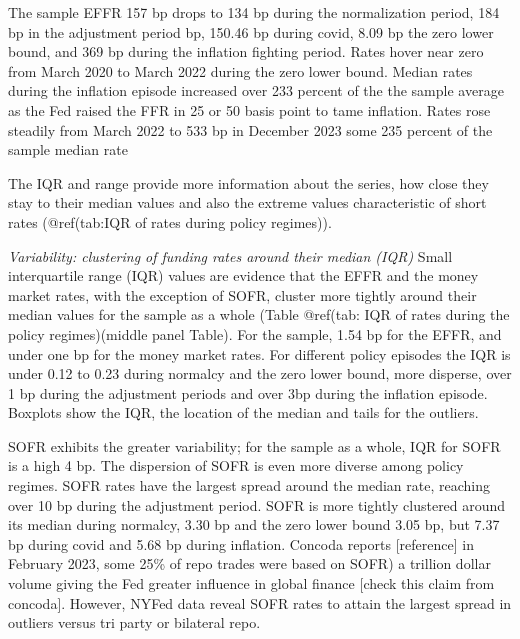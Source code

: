 \documentclass[
]{article}
\begin{document}
The sample EFFR 157 bp drops to 134 bp during the normalization period, 184 bp in the adjustment period bp, 150.46 bp during covid, 8.09 bp the zero lower bound, and 369 bp during the inflation fighting period. Rates hover near zero from March 2020 to March 2022 during the zero lower bound. Median rates during the inflation episode increased over 233 percent of the the sample average as the Fed raised the FFR in 25 or 50 basis point to tame inflation. Rates rose steadily from March 2022 to 533 bp in December 2023 some 235 percent of the sample median rate

The IQR and range provide more information about the series, how close they stay to their median values and also the extreme values characteristic of short rates (@ref(tab:IQR of rates during policy regimes)).

\emph{Variability: clustering of funding rates  around their median (IQR)}
Small interquartile range (IQR) values are evidence that the EFFR and the money market rates, with the exception of SOFR, cluster more tightly around their median values for the sample as a whole (Table @ref(tab: IQR of rates during the policy regimes)(middle panel Table). For the sample, 1.54 bp for the EFFR, and under one bp for the money market rates. For different policy episodes the IQR is under 0.12 to 0.23 during normalcy and the zero lower bound, more disperse, over 1 bp during the adjustment periods and over 3bp during the inflation episode. Boxplots show the IQR, the location of the median and tails for the outliers.

SOFR exhibits the greater variability; for the sample as a whole, IQR for SOFR is a high 4 bp. The dispersion of SOFR is even more diverse among policy regimes. SOFR rates have the largest spread around the median rate, reaching over 10 bp during the adjustment period. SOFR is more tightly clustered around its median during normalcy, 3.30 bp and the zero lower bound 3.05 bp, but 7.37 bp during covid and 5.68 bp during inflation. Concoda reports {[}reference{]} in February 2023, some 25\% of repo trades were based on SOFR) a trillion dollar volume giving the Fed greater influence in global finance {[}check this claim from concoda{]}. However, NYFed data reveal SOFR rates to attain the largest spread in outliers versus tri party or bilateral repo.
\end{document}
